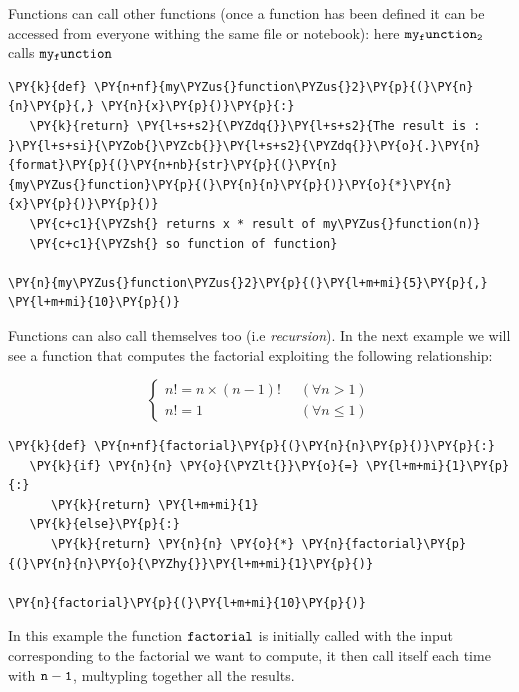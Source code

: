 \begin{Shaded}
\begin{Highlighting}[]
\end{Highlighting}
\end{Shaded}

Functions can call other functions (once a function has been defined it can be accessed from everyone withing the same file or notebook): here $\tt{my_function_2}$ calls $\tt{my_function}$

\begin{Verbatim}[commandchars=\\\{\}]
\PY{k}{def} \PY{n+nf}{my\PYZus{}function\PYZus{}2}\PY{p}{(}\PY{n}{n}\PY{p}{,} \PY{n}{x}\PY{p}{)}\PY{p}{:} 
   \PY{k}{return} \PY{l+s+s2}{\PYZdq{}}\PY{l+s+s2}{The result is : }\PY{l+s+si}{\PYZob{}\PYZcb{}}\PY{l+s+s2}{\PYZdq{}}\PY{o}{.}\PY{n}{format}\PY{p}{(}\PY{n+nb}{str}\PY{p}{(}\PY{n}{my\PYZus{}function}\PY{p}{(}\PY{n}{n}\PY{p}{)}\PY{o}{*}\PY{n}{x}\PY{p}{)}\PY{p}{)}
   \PY{c+c1}{\PYZsh{} returns x * result of my\PYZus{}function(n)}
   \PY{c+c1}{\PYZsh{} so function of function}

\PY{n}{my\PYZus{}function\PYZus{}2}\PY{p}{(}\PY{l+m+mi}{5}\PY{p}{,} \PY{l+m+mi}{10}\PY{p}{)}
\end{Verbatim}

Functions can also call themselves too (i.e \emph{recursion}). In the next example we will see a function that computes the factorial exploiting the following relationship:

\[
\begin{cases}
    n! = n \times (n-1)! & \;\; (\forall n \gt 1) \\
    n! = 1 & \;\; (\forall n \le 1)
\end{cases}
\]

\begin{Verbatim}[commandchars=\\\{\}]
\PY{k}{def} \PY{n+nf}{factorial}\PY{p}{(}\PY{n}{n}\PY{p}{)}\PY{p}{:}
   \PY{k}{if} \PY{n}{n} \PY{o}{\PYZlt{}}\PY{o}{=} \PY{l+m+mi}{1}\PY{p}{:}
      \PY{k}{return} \PY{l+m+mi}{1}
   \PY{k}{else}\PY{p}{:}
      \PY{k}{return} \PY{n}{n} \PY{o}{*} \PY{n}{factorial}\PY{p}{(}\PY{n}{n}\PY{o}{\PYZhy{}}\PY{l+m+mi}{1}\PY{p}{)}

\PY{n}{factorial}\PY{p}{(}\PY{l+m+mi}{10}\PY{p}{)}
\end{Verbatim}

In this example the function $\tt{factorial}$ is initially called with the input corresponding to the factorial we want to compute, it then call itself each time with $\tt{n-1}$, multypling together all the results.

